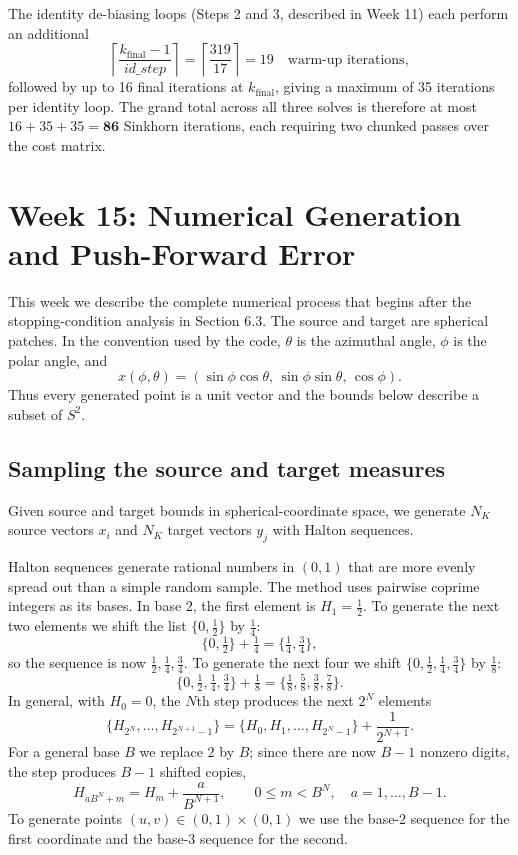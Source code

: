 \documentclass{article}
\begin{document}
The identity de-biasing loops (Steps 2 and 3, described in Week 11) each perform an additional
\begin{equation}
    \left\lceil \frac{k_{\mathrm{final}} - 1}{id\_step} \right\rceil
    = \left\lceil \frac{319}{17} \right\rceil = 19 \quad \text{warm-up iterations},
\end{equation}
followed by up to 16 final iterations at $k_{\mathrm{final}}$, giving a maximum of 35 iterations per identity loop. The grand total across all three solves is therefore at most $16 + 35 + 35 = \mathbf{86}$ Sinkhorn iterations, each requiring two chunked passes over the cost matrix.

\clearpage
\section{Week 15: Numerical Generation and Push-Forward Error}

This week we describe the complete numerical process that begins after the
stopping-condition analysis in Section 6.3.  The source and target are spherical
patches.  In the convention used by the code, $\theta$ is the azimuthal angle,
$\phi$ is the polar angle, and
\[
    x(\phi,\theta) = (\sin\phi\cos\theta,\,\sin\phi\sin\theta,\,\cos\phi).
\]
Thus every generated point is a unit vector and the bounds below describe a
subset of $S^2$.

\subsection{Sampling the source and target measures}

Given source and target bounds in spherical-coordinate space, we generate
$N_K$ source vectors $x_i$ and $N_K$ target vectors $y_j$ with Halton sequences.

Halton sequences generate rational numbers in $(0,1)$ that are more evenly
spread out than a simple random sample.  The method uses pairwise coprime
integers as its bases.  In base $2$, the first element is $H_1=\tfrac12$.  To
generate the next two elements we shift the list $\{0,\tfrac12\}$ by
$\tfrac14$:
\[
    \{0,\tfrac12\}+\tfrac14=\{\tfrac14,\tfrac34\},
\]
so the sequence is now $\tfrac12,\tfrac14,\tfrac34$.  To generate the next
four we shift $\{0,\tfrac12,\tfrac14,\tfrac34\}$ by $\tfrac18$:
\[
    \{0,\tfrac12,\tfrac14,\tfrac34\}+\tfrac18
    =\{\tfrac18,\tfrac58,\tfrac38,\tfrac78\}.
\]
In general, with $H_0=0$, the $N$th step produces the next $2^N$ elements
\[
    \{H_{2^N},\ldots,H_{2^{N+1}-1}\}
    =\{H_0,H_1,\ldots,H_{2^N-1}\}+\frac{1}{2^{N+1}}.
\]
For a general base $B$ we replace $2$ by $B$; since there are now $B-1$
nonzero digits, the step produces $B-1$ shifted copies,
\[
    H_{aB^N+m}=H_m+\frac{a}{B^{N+1}},
    \qquad 0\le m<B^N,\quad a=1,\ldots,B-1.
\]
To generate points $(u,v)\in(0,1)\times(0,1)$ we use the base-$2$ sequence for
the first coordinate and the base-$3$ sequence for the second.
\end{document}
